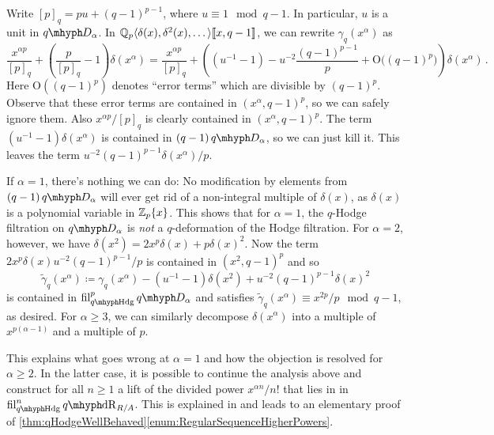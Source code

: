 \documentclass[DIV=12,numbers=enddot,leqno,bibliography=totoc]{scrartcl}
\begin{document}
\begin{exm}
		Write $[p]_q=pu+(q-1)^{p-1}$, where $u\equiv 1\mod q-1$. In particular, $u$ is a unit in $\q D_\alpha$. In $\mathbb{Q}_p\langle \delta(x),\delta^2(x),\dotsc\rangle\llbracket x,q-1\rrbracket$, we can rewrite $\gamma_q(x^\alpha)$ as
		\begin{equation*}
			\frac{x^{\alpha p}}{[p]_q}+\left(\frac{p}{[p]_q}-1\right)\delta(x^\alpha)=\frac{x^{\alpha p}}{[p]_q}+\left((u^{-1}-1)-u^{-2}\frac{(q-1)^{p-1}}{p}+\mathrm{O}\bigl((q-1)^p\bigr)\right)\delta(x^\alpha)\,.
		\end{equation*}
		Here $\mathrm{O}((q-1)^p)$ denotes \enquote{error terms} which are divisible by $(q-1)^p$. Observe that these error terms are contained in $(x^\alpha,q-1)^p$, so we can safely ignore them. Also $x^{\alpha p}/[p]_q$ is clearly contained in $(x^\alpha,q-1)^p$. The term $(u^{-1}-1)\delta(x^\alpha)$ is contained in $(q-1)\q D_\alpha$, so we can just kill it. This leaves the term $u^{-2}(q-1)^{p-1}\delta(x^\alpha)/p$.
		
		If $\alpha=1$, there's nothing we can do: No modification by elements from $(q-1)\q D_\alpha$ will ever get rid of a non-integral multiple of  $\delta(x)$, as $\delta(x)$ is a polynomial variable in $\mathbb{Z}_p\{x\}$. This shows that for $\alpha=1$, the $q$-Hodge filtration on $\q D_\alpha$ is \emph{not} a $q$-deformation of the Hodge filtration. For $\alpha=2$, however, we have $\delta(x^2)=2x^p\delta(x)+p\delta(x)^2$. Now the term $2x^p\delta(x)u^{-2}(q-1)^{p-1}/p$ is contained in $(x^2,q-1)^p$ and so
		\begin{equation*}
			\widetilde{\gamma}_q(x^\alpha)\coloneqq \gamma_q(x^\alpha)-(u^{-1}-1)\delta(x^2)+u^{-2}(q-1)^{p-1}\delta(x)^2
		\end{equation*}
		is contained in $\fil_{\qHodge}^p\q D_\alpha$ and satisfies $\widetilde{\gamma}_q(x^\alpha)\equiv x^{2p}/p\mod q-1$, as desired. For $\alpha\geqslant 3$, we can similarly decompose $\delta(x^\alpha)$ into a multiple of $x^{p(\alpha-1)}$ and a multiple of $p$.%
		
		This explains what goes wrong at $\alpha=1$ and how the objection is resolved for $\alpha\geqslant2$. In the latter case, it is possible to continue the analysis above and construct for all $n\geqslant 1$ a lift of the divided power $x^{\alpha n}/n!$ that lies in in $\fil_{\qHodge}^n\qdeRham_{R/A}$. This is explained in \cite[\S{}]{qHodge} and leads to an elementary proof of \cref{thm:qHodgeWellBehaved}\cref{enum:RegularSequenceHigherPowers}. 
	\end{exm}
\end{document}
